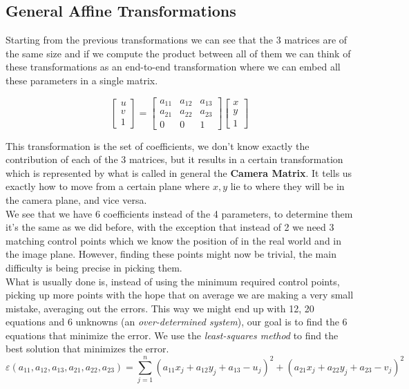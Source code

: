 \subsection{General Affine Transformations}

Starting from the previous transformations we can see that the 3 matrices are of the same size and if we compute the product between all of them we can think of these transformations as an end-to-end transformation where we can embed all these parameters in a single matrix.

\[
    \begin{bmatrix}
    u \\
    v \\
    1
    \end{bmatrix}
    =
    \begin{bmatrix}
    a_{11} & a_{12} & a_{13} \\
    a_{21} & a_{22} & a_{23} \\
    0 & 0 & 1
    \end{bmatrix}
    \begin{bmatrix}
        x \\
        y \\
        1
    \end{bmatrix}
\]

This transformation is the set of coefficients, we don't know exactly the contribution of each of the 3 matrices, but it results in a certain transformation which is represented by what is called in general the \textbf{Camera Matrix}. It tells us exactly how to move from a certain plane where \(x, y\) lie to where they will be in the camera plane, and vice versa.
\\
We see that we have 6 coefficients instead of the 4 parameters, to determine them it's the same as we did before, with the exception that instead of 2 we need 3 matching control points which we know the position of in the real world and in the image plane. However, finding these points might now be trivial,
the main difficulty is being precise in picking them.
\\
What is usually done is, instead of using the minimum required control points, picking up more points with the hope that on average we are making a very small mistake, averaging out the errors. This way we might end up with 12, 20 equations and 6 unknowns (an \textit{over-determined system}), our goal is to find the 6 equations that minimize the error. We use the \textit{least-squares method} to find the best solution that minimizes the error.
\[
    \varepsilon (a_{11}, a_{12}, a_{13}, a_{21}, a_{22}, a_{23}) = 
\sum_{j=1}^{n} (a_{11}x_j + a_{12}y_j + a_{13} - u_j)^2 
+ (a_{21}x_j + a_{22}y_j + a_{23} - v_j)^2
\]

